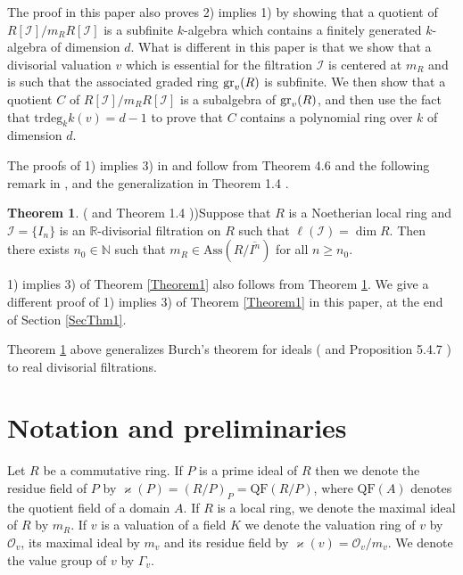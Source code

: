 \documentclass[11pt]{amsart}
\def\NZQ{\mathbb}               %
\def\NN{{\NZQ N}}
\def\RR{{\NZQ R}}
\theoremstyle{definition}
\newtheorem{Theorem}{Theorem}[section]
\let\kappa=\varkappa
\begin{document}
The proof in this paper also proves 2) implies 1) by showing that a quotient of 
\linebreak $R[\mathcal I]/m_RR[\mathcal I]$ is 
a subfinite $k$-algebra  which contains a finitely generated $k$-algebra of dimension $d$. What is different in this paper is that we show that a divisorial valuation $v$ which is essential for the filtration $\mathcal I$ is centered at $m_R$ and is such that the associated graded ring ${\rm gr}_v(R)$ is subfinite.  We then show that a quotient $C$ of $R[\mathcal I]/m_RR[\mathcal I]$ is a subalgebra of ${\rm gr}_v(R)$, and then 
use the fact that $\mbox{trdeg}_{k}k(v)=d-1$ to prove that $C$ contains a polynomial ring over $k$ of dimension $d$. 

The proofs of 1) implies 3) in \cite{C1} and \cite{C2} follow from Theorem 4.6 and the following remark in \cite{CPS}, and the generalization in Theorem 1.4 \cite{C2}.

\begin{Theorem}(\cite[Theorem 4.6]{CPS} and Theorem 1.4 \cite{C2}))\label{TheoremN2} Suppose that $R$ is a Noetherian local ring and $\mathcal I=\{I_n\}$ is  an $\RR$-divisorial filtration on $R$ such that $\ell(\mathcal I)=\dim R$. Then there exists $n_0\in \NN$ such that $m_R\in \mbox{Ass}(R/\overline{I^n})$ for all $n\ge n_0$.
 \end{Theorem} 

1) implies 3) of Theorem \ref{Theorem1} also follows from Theorem \ref{TheoremN2}. We give a different proof of 1) implies 3) of Theorem \ref{Theorem1} in this paper, at the end of Section \ref{SecThm1}.

Theorem \ref{TheoremN2} above generalizes Burch's theorem for ideals (\cite{Bu} and Proposition 5.4.7 \cite{HS}) to real divisorial filtrations.
 

\section{Notation and preliminaries}\label{SecNot} Let $R$ be a commutative ring. If $P$ is a prime ideal of $R$ then we denote the residue field of $P$ by
$\kappa(P)=(R/P)_P= \mbox{QF}(R/P)$, where $\mbox{QF}(A)$ denotes the quotient field of a domain $A$. If $R$ is a local ring, we denote the maximal ideal of $R$ by $m_R$. If $v$ is a valuation of a field $K$ we denote the valuation ring of $v$ by $\mathcal O_v$, its maximal ideal by $m_v$ and its residue field by $\kappa(v)=\mathcal O_v/m_v$. We denote the value group of $v$ by $\Gamma_v$.
\end{document}
